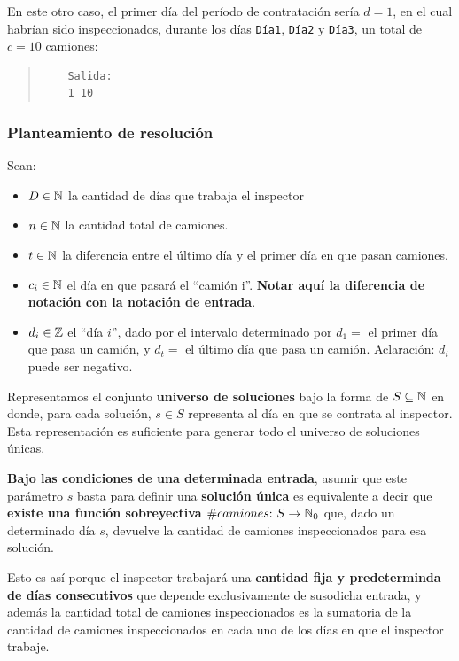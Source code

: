 \documentclass[11pt, a4paper, twoside]{article}
\begin{document}
\begin{ejemplo}
  En este otro caso, el primer día del período de contratación sería $d=1$, en el cual
  habrían sido inspeccionados, durante los días \texttt{Día1}, \texttt{Día2} y
  \texttt{Día3}, un total de $c=10$ camiones:

  \begin{quote}
    \begin{verbatim}
    Salida:
    1 10
    \end{verbatim}
  \end{quote}

\end{ejemplo}

\subsubsection{Planteamiento de resolución}\label{subsubsec:problema1-resolucion}


\begin{notacion}
Sean: 
  \begin{itemize}
    \item $D \in \mathbb{N}$ la cantidad de días que trabaja el inspector
    \item $n \in \mathbb{N}$ la cantidad total de camiones.
    \item $t \in \mathbb{N}$ la diferencia entre el último día y el primer día en que pasan camiones.
    \item $c_{i} \in \mathbb{N}$ el día en que pasará el ``camión i''. \textbf{Notar aquí la diferencia de notación con la notación de entrada}.
  \item $d_{i} \in \mathbb{Z}$ el ``día $i$'', dado por el intervalo determinado por $d_{1} =$ el primer día que pasa un camión, y $d_{t} =$ el último día que pasa un camión. Aclaración: $d_{i}$ puede ser negativo.
  \end{itemize}
\end{notacion}

\begin{proposicion}
Representamos el conjunto \textbf{universo de soluciones} bajo la forma de 
\textbf{$S \subseteq \mathbb{N}$} en donde, para cada solución, \textbf{$s \in S$} 
representa al día en que se contrata al inspector.
Esta representación es suficiente para generar todo el universo de soluciones únicas.
\end{proposicion}
\begin{demostracion}\label{dem:ej1_1}
\textbf{Bajo las condiciones de una determinada entrada}, asumir que este 
parámetro \textbf{$s$} basta para definir una \textbf{solución única}
es equivalente a decir que
\textbf{existe una función sobreyectiva $\#camiones{:}~S\rightarrow\mathbb{N}_{0}$}
que, dado un determinado día \textbf{$s$}, devuelve la cantidad de camiones 
inspeccionados para esa solución.

Esto es así porque el inspector trabajará una \textbf{cantidad fija y predeterminda
de días consecutivos} que depende exclusivamente de susodicha entrada, y 
además la cantidad total de camiones inspeccionados es la sumatoria de la cantidad
de camiones inspeccionados en cada uno de los días en que el inspector trabaje.
\end{demostracion}
\end{document}
